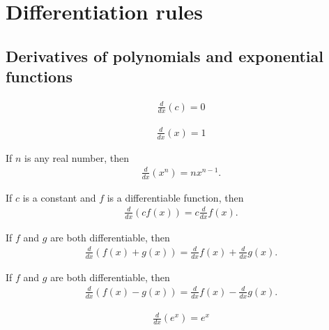 \documentclass{article}
\begin{document}
\section{Differentiation rules}
\subsection{Derivatives of polynomials and exponential functions}
\begin{theorem}
    \begin{align*}
        \frac{d}{dx}(c) = 0
    \end{align*}
\end{theorem}
\begin{theorem}
    \begin{align*}
        \frac{d}{dx}(x) = 1
    \end{align*}
\end{theorem}
\begin{theorem}
    If $n$ is any real number, then
    \begin{align*}
        \frac{d}{dx}(x^n) = nx^{n-1}.
    \end{align*}
\end{theorem}
\begin{theorem}
    If $c$ is a constant and $f$ is a differentiable function, then
    \begin{align*}
        \frac{d}{dx}(cf(x))=c\frac{d}{dx}f(x).
    \end{align*}
\end{theorem}
\begin{theorem}
    If $f$ and $g$ are both differentiable, then
    \begin{align*}
        \frac{d}{dx}(f(x)+g(x))=\frac{d}{dx}f(x)+\frac{d}{dx}g(x).
    \end{align*}
\end{theorem}
\begin{theorem}
    If $f$ and $g$ are both differentiable, then
    \begin{align*}
        \frac{d}{dx}(f(x)-g(x))=\frac{d}{dx}f(x)-\frac{d}{dx}g(x).
    \end{align*}
\end{theorem}
\begin{theorem}
    \begin{align*}
        \frac{d}{dx}(e^x)=e^x
    \end{align*}
\end{theorem}
\end{document}
